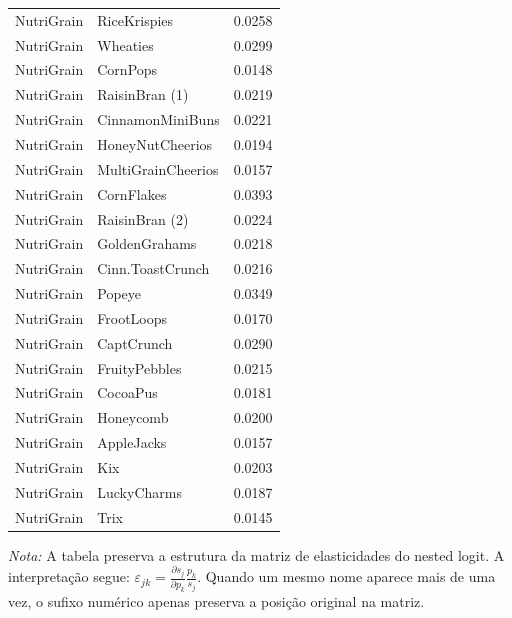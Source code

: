\begin{table}[H]
\begin{tabular}{llr}
NutriGrain & RiceKrispies & 0.0258 \\
NutriGrain & Wheaties & 0.0299 \\
NutriGrain & CornPops & 0.0148 \\
NutriGrain & RaisinBran (1) & 0.0219 \\
NutriGrain & CinnamonMiniBuns & 0.0221 \\
NutriGrain & HoneyNutCheerios & 0.0194 \\
NutriGrain & MultiGrainCheerios & 0.0157 \\
NutriGrain & CornFlakes & 0.0393 \\
NutriGrain & RaisinBran (2) & 0.0224 \\
NutriGrain & GoldenGrahams & 0.0218 \\
NutriGrain & Cinn.ToastCrunch & 0.0216 \\
NutriGrain & Popeye & 0.0349 \\
NutriGrain & FrootLoops & 0.0170 \\
NutriGrain & CaptCrunch & 0.0290 \\
NutriGrain & FruityPebbles & 0.0215 \\
NutriGrain & CocoaPus & 0.0181 \\
NutriGrain & Honeycomb & 0.0200 \\
NutriGrain & AppleJacks & 0.0157 \\
NutriGrain & Kix & 0.0203 \\
NutriGrain & LuckyCharms & 0.0187 \\
NutriGrain & Trix & 0.0145 \\
\bottomrule
\end{tabular}

\vspace{0.3em}
\footnotesize
\textit{Nota:} A tabela preserva a estrutura da matriz de elasticidades do nested logit. A interpretação segue: $\varepsilon_{jk}=\frac{\partial s_j}{\partial p_k}\frac{p_k}{s_j}$. Quando um mesmo nome aparece mais de uma vez, o sufixo numérico apenas preserva a posição original na matriz.
\end{table}
\endgroup


